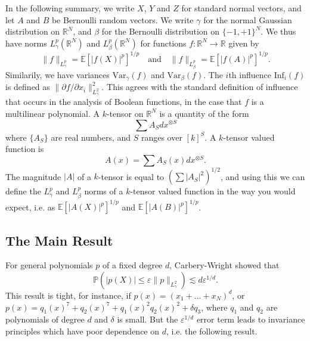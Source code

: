 \documentclass[12pt]{article}
\begin{document}
In the following summary, we write $X$, $Y$ and $Z$ for standard normal vectors, and let $A$ and $B$ be Bernoulli random vectors. We write $\gamma$ for the normal Gaussian distribution on $\mathbb{R}^N$, and $\beta$ for the Bernoulli distribution on $\{ -1, +1 \}^N$. We thus have norms $L^p_\gamma(\mathbb{R}^N)$ and $L^p_\beta(\mathbb{R}^N)$ for functions $f: \mathbb{R}^N \to \mathbb{R}$ given by
%
\[ \| f \|_{L^p_\gamma} = \mathbb{E}[|f(X)|^p]^{1/p} \quad\text{and}\quad \| f \|_{L^p_\beta} = \mathbb{E}[|f(A)|^p]^{1/p}. \]
%
Similarily, we have variances $\text{Var}_\gamma(f)$ and $\text{Var}_\beta(f)$. The $i$th influence $\text{Inf}_i(f)$ is defined as $\| \partial f / \partial x_i \|_{L^2_\gamma}^2$. This agrees with the standard definition of influence that occurs in the analysis of Boolean functions, in the case that $f$ is a multilinear polynomial. A $k$-tensor on $\mathbb{R}^N$ is a quantity of the form
    \[ \sum A_S dx^{\otimes S} \]
    where $\{ A_S \}$ are real numbers, and $S$ ranges over $[k]^S$. A $k$-tensor valued function is
    \[ A(x) = \sum A_S(x) dx^{\otimes S}. \]
    The magnitude $|A|$ of a $k$-tensor is equal to $(\sum |A_S|^2 )^{1/2}$, and using this we can define the $L^p_\gamma$ and $L^p_\beta$ norms of a $k$-tensor valued function in the way you would expect, i.e. as $\mathbb{E}[|A(X)|^p]^{1/p}$ and $\mathbb{E}[|A(B)|^p]^{1/p}$. %

\subsection{The Main Result}

For general polynomials $p$ of a fixed degree $d$, Carbery-Wright showed that
%
\[ \mathbb{P}(|p(X)| \leq \varepsilon \| p \|_{L^2_\gamma}) \lesssim d \varepsilon^{1/d}. \]
%
This result is tight, for instance, if $p(x) = (x_1 + \dots + x_N)^d$, or $p(x) = q_1(x)^7 + q_2(x)^7 + q_1(x)^2 q_2(x)^2 + \delta q_3$, where $q_1$ and $q_2$ are polynomials of degree $d$ and $\delta$ is small. But the $\varepsilon^{1/d}$ error term leads to invariance principles which have poor dependence on $d$, i.e. the following result.
\end{document}
